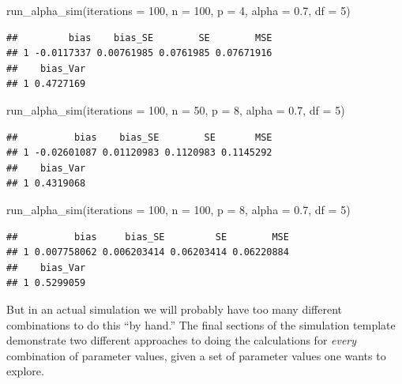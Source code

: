 \documentclass[
]{book}
\newenvironment{Shaded}{\begin{snugshade}}{\end{snugshade}}
\newcommand{\AttributeTok}[1]{\textcolor[rgb]{0.77,0.63,0.00}{#1}}
\newcommand{\DecValTok}[1]{\textcolor[rgb]{0.00,0.00,0.81}{#1}}
\newcommand{\FloatTok}[1]{\textcolor[rgb]{0.00,0.00,0.81}{#1}}
\newcommand{\FunctionTok}[1]{\textcolor[rgb]{0.00,0.00,0.00}{#1}}
\newcommand{\NormalTok}[1]{#1}
\begin{document}
\begin{Shaded}
\begin{Highlighting}[]
\FunctionTok{run\_alpha\_sim}\NormalTok{(}\AttributeTok{iterations =} \DecValTok{100}\NormalTok{, }\AttributeTok{n =} \DecValTok{100}\NormalTok{, }\AttributeTok{p =} \DecValTok{4}\NormalTok{, }\AttributeTok{alpha =} \FloatTok{0.7}\NormalTok{, }\AttributeTok{df =} \DecValTok{5}\NormalTok{)}
\end{Highlighting}
\end{Shaded}

\begin{verbatim}
##         bias    bias_SE        SE        MSE
## 1 -0.0117337 0.00761985 0.0761985 0.07671916
##    bias_Var
## 1 0.4727169
\end{verbatim}

\begin{Shaded}
\begin{Highlighting}[]
\FunctionTok{run\_alpha\_sim}\NormalTok{(}\AttributeTok{iterations =} \DecValTok{100}\NormalTok{, }\AttributeTok{n =} \DecValTok{50}\NormalTok{, }\AttributeTok{p =} \DecValTok{8}\NormalTok{, }\AttributeTok{alpha =} \FloatTok{0.7}\NormalTok{, }\AttributeTok{df =} \DecValTok{5}\NormalTok{)}
\end{Highlighting}
\end{Shaded}

\begin{verbatim}
##          bias    bias_SE        SE       MSE
## 1 -0.02601087 0.01120983 0.1120983 0.1145292
##    bias_Var
## 1 0.4319068
\end{verbatim}

\begin{Shaded}
\begin{Highlighting}[]
\FunctionTok{run\_alpha\_sim}\NormalTok{(}\AttributeTok{iterations =} \DecValTok{100}\NormalTok{, }\AttributeTok{n =} \DecValTok{100}\NormalTok{, }\AttributeTok{p =} \DecValTok{8}\NormalTok{, }\AttributeTok{alpha =} \FloatTok{0.7}\NormalTok{, }\AttributeTok{df =} \DecValTok{5}\NormalTok{)}
\end{Highlighting}
\end{Shaded}

\begin{verbatim}
##          bias     bias_SE         SE        MSE
## 1 0.007758062 0.006203414 0.06203414 0.06220884
##    bias_Var
## 1 0.5299059
\end{verbatim}

But in an actual simulation we will probably have too many different combinations to do this ``by hand.''
The final sections of the simulation template demonstrate two different approaches to doing the calculations for \emph{every} combination of parameter values, given a set of parameter values one wants to explore.
\end{document}
